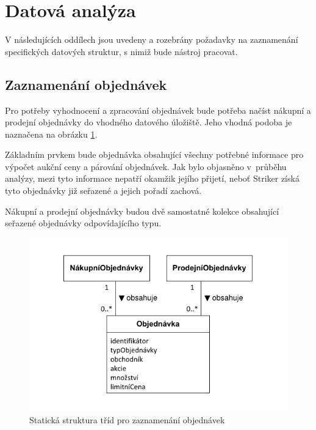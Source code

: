 \documentclass[thesis=M,czech]{FITthesis}[2012/06/26]
\begin{document}

\section{Datová analýza}

V následujících oddílech jsou uvedeny a rozebrány požadavky na zaznamenání specifických datových struktur, s nimiž bude nástroj pracovat.


\subsection{Zaznamenání objednávek}

Pro potřeby vyhodnocení a zpracování objednávek bude potřeba načíst nákupní a prodejní objednávky do vhodného datového 
úložiště. Jeho vhodná podoba je naznačena na obrázku \ref{fig:statdiagram-order}.

Základním prvkem bude objednávka obsahující všechny potřebné informace pro výpočet aukční ceny a párování objednávek. Jak 
bylo objasněno v~průběhu analýzy, mezi tyto informace nepatří okamžik jejího přijetí, neboť Striker získá tyto objednávky již seřazené 
a jejich pořadí zachová.

Nákupní a prodejní objednávky budou dvě samostatné kolekce obsahující seřazené objednávky odpovídajícího typu.

\begin{figure}\centering
	\includegraphics[]{images/statdiagram-order} 
	\caption[Statická struktura tříd pro zaznamenání objednávek]{Statická struktura tříd pro zaznamenání objednávek}\label{fig:statdiagram-order}
\end{figure}
\end{document}
